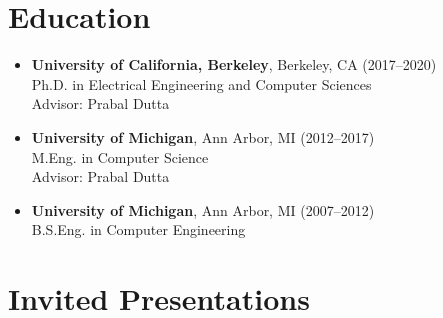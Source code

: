 \documentclass{article}
\begin{document}
\section*{Education}

\begin{itemize}
  \item[]
    \textbf{University of California, Berkeley}, Berkeley, CA (2017--2020) \\
    Ph.D. in Electrical Engineering and Computer Sciences \\
    Advisor: Prabal Dutta

  \item[]
    \textbf{University of Michigan}, Ann Arbor, MI (2012--2017) \\
    M.Eng. in Computer Science \\
    Advisor: Prabal Dutta

  \item[]
    \textbf{University of Michigan}, Ann Arbor, MI (2007--2012) \\
    B.S.Eng. in Computer Engineering
\end{itemize}












\section*{Invited Presentations}
\end{document}
